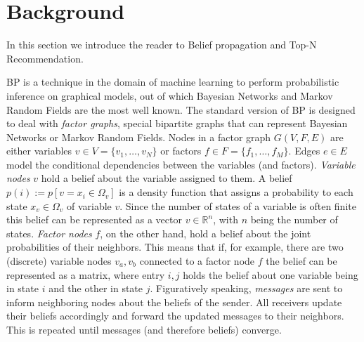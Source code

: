 \section{Background}\label{sec:background}

In this section we introduce the reader to Belief propagation and Top-N Recommendation.

BP is a technique in the domain of machine learning to perform probabilistic inference on graphical models, out of which Bayesian Networks and Mar\-kov Random Fields are the most well known. The standard version of BP is designed to deal with \textit{factor graphs}, special bipartite graphs that can represent Bayesian Networks or Markov Random Fields. Nodes in a factor graph $G(V,F,E)$ are either variables $v \in V = \{ v_1, \ldots, v_N \}$ or factors $f \in F = \{f_1, \ldots, f_M \}$. Edges $e\in E$ model the conditional dependencies between the variables (and factors).
\textit{Variable nodes} $v$ hold a belief about the variable assigned to them. A belief $p(i):=p[v=x_i\in\Omega_{v}]$ is a density function that assigns a probability to each state $x_v \in \Omega_v$ of variable $v$. Since the number of states of a variable is often finite this belief can be represented as a vector $v \in \mathbb{R}^n$, with $n$ being the number of states. 
\textit{Factor nodes} $f$, on the other hand, hold a belief about the joint probabilities of their neighbors. 
This means that if, for example, there are two (discrete) variable nodes $v_a, v_b$ connected to a factor node $f$ the belief can be represented as a matrix, where entry $i,j$ holds the belief about one variable being in state $i$  and the other in state $j$. Figuratively speaking, \textit{messages} are sent to inform neighboring nodes about the beliefs of the sender. All receivers update their beliefs accordingly and forward the updated messages to their neighbors. This is repeated until messages (and therefore beliefs) converge. 

